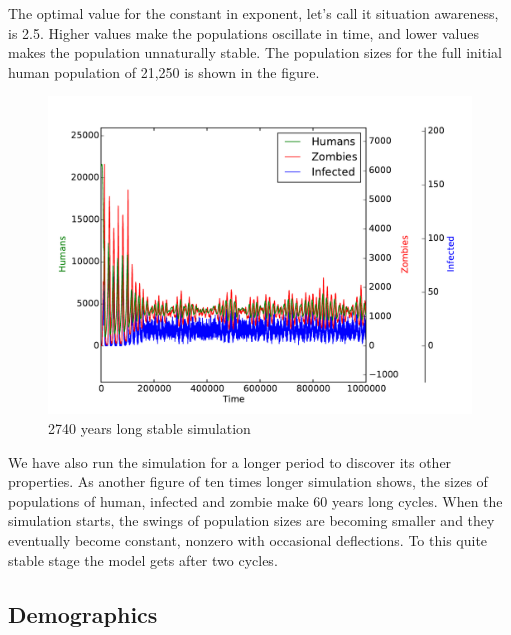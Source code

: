 \documentclass[a4paper]{article}
\begin{document}
The optimal value for the constant in exponent, let's call it situation awareness, is 2.5.
Higher values make the populations oscillate in time, and lower values makes the population unnaturally stable.
The population sizes for the full initial human population of 21,250 is shown in the figure.

\begin{figure}[pht]
    \centering
    \includegraphics[width=\textwidth]{stable_1000000}
    \caption{2740 years long stable simulation}
\end{figure}

We have also run the simulation for a longer period to discover its other properties.
As another figure of ten times longer simulation shows, the sizes of populations of human, infected and zombie make 60 years long cycles.
When the simulation starts, the swings of population sizes are becoming smaller and they eventually become constant, nonzero with occasional deflections.
To this quite stable stage the model gets after two cycles.

\subsection{Demographics}
\end{document}
